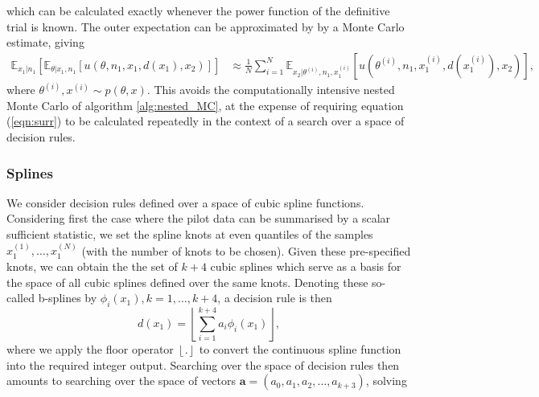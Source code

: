 \documentclass[sagev, Crown]{sagej} %
\begin{document}
which can be calculated exactly whenever the power function of the definitive trial is known. The outer expectation can be approximated by by a Monte Carlo estimate, giving
\begin{align}
\mathbb{E}_{x_1 | n_1} \left[ \mathbb{E}_{\theta | x_1, n_1}[ u(\theta, n_1, x_1, d(x_1), x_2)] \right] & \approx \frac{1}{N} \sum_{i=1}^{N} \mathbb{E}_{x_2 | \theta^{(i)}, n_1, x_1^{(i)}}[ u(\theta^{(i)}, n_1, x_1^{(i)}, d(x_1^{(i)}), x_2) ],
\end{align}
where $\theta^{(i)}, x^{(i)} \sim p(\theta, x)$. This avoids the computationally intensive nested Monte Carlo of algorithm \ref{alg:nested_MC}, at the expense of requiring equation (\ref{eqn:surr}) to be calculated repeatedly in the context of a search over a space of decision rules.



\subsubsection{Splines}

We consider decision rules defined over a space of cubic spline functions. Considering first the case where the pilot data can be summarised by a scalar sufficient statistic, we set the spline knots at even quantiles of the samples $x_1^{(1)}, \ldots , x_1^{(N)}$ (with the number of knots to be chosen). Given these pre-specified knots, we can obtain the the set of $k + 4$ cubic splines which serve as a basis for the space of all cubic splines defined over the same knots. Denoting these so-called b-splines by $\phi_i(x_1), k=1,\ldots,k+4$, a decision rule is then
$$
d(x_1) = \left\lfloor \sum_{i=1}^{k+4} a_i \phi_i(x_1) \right\rfloor,
$$
where we apply the floor operator $\left\lfloor . \right\rfloor$ to convert the continuous spline function into the required integer output. Searching over the space of decision rules then amounts to searching over the space of vectors $\mathbf{a} = (a_0, a_1, a_2, \ldots , a_{k+3})$, solving
\end{document}
